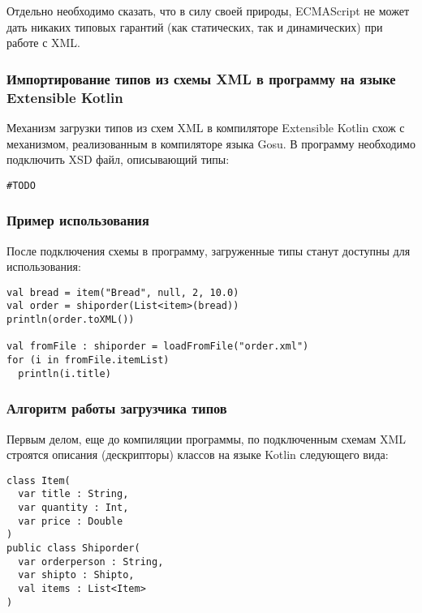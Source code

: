 Отдельно необходимо сказать, что в силу своей природы, ECMAScript не может дать никаких типовых гарантий (как статических, так и динамических) при работе с XML.

\subsubsection{Импортирование типов из схемы XML в программу на языке Extensible Kotlin}
Механизм загрузки типов из схем XML в компиляторе Extensible Kotlin схож с механизмом, реализованным в компиляторе языка Gosu.
В программу необходимо подключить XSD файл, описывающий типы:
\begin{lstlisting}[caption={Подключение XML схемы в программу на языке Kotlin.}, label={xsd-type-loading-extension-point}]
#TODO
\end{lstlisting}

\subsubsection{Пример использования}
После подключения схемы в программу, загруженные типы станут доступны для использования: \td

\begin{lstlisting}[caption={Пример использования типов, загруженных из XML схемы в языке Kotlin.}, label=kotlin-simple-xml-example]
val bread = item("Bread", null, 2, 10.0)
val order = shiporder(List<item>(bread))
println(order.toXML())

val fromFile : shiporder = loadFromFile("order.xml")
for (i in fromFile.itemList)
  println(i.title)
\end{lstlisting}

\subsubsection{Алгоритм работы загрузчика типов}

Первым делом, еще до компиляции программы, по подключенным схемам XML строятся описания (дескрипторы) классов на языке Kotlin следующего вида:

\begin{lstlisting}[caption={Примеры описаний классов для загруженных типов.}, label=xsd-type-descriptors]
class Item(
  var title : String,
  var quantity : Int,
  var price : Double
)
public class Shiporder(
  var orderperson : String,
  var shipto : Shipto,
  val items : List<Item>
)
\end{lstlisting}

